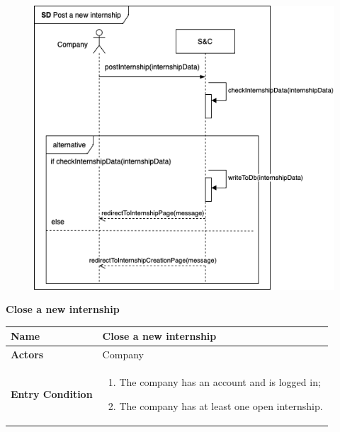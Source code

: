 \begin{enumerate}[label=\textbf{[US\arabic*]}, left = 0pt, align = left, resume]
\begin{longtable}{|l|p{11cm}|}
            \end{longtable}

            \newpage
            \begin{figure}[h!]
                \centering  \includegraphics{RASD/Images/UseCases/PostNewInternship.drawio.png}
                \label{fig:example}
            \end{figure}

            \newpage
            \item \textbf{Close a new internship}
            
            \begin{longtable}{|l|p{11cm}|}  
                \hline
                \textbf{Name} & 
                    \textbf{Close a new internship} \\
                \hline
                
                \textbf{Actors} & 
                    Company \\
                \hline
                
                \textbf{Entry Condition} & 
                    \begin{enumerate}[label=\textbullet, itemsep=0em]
                        \item The company has an account and is logged in;
                        \item The company has at least one open internship.
                    \end{enumerate} \\
                \hline 
                

\end{longtable}
\end{enumerate}

